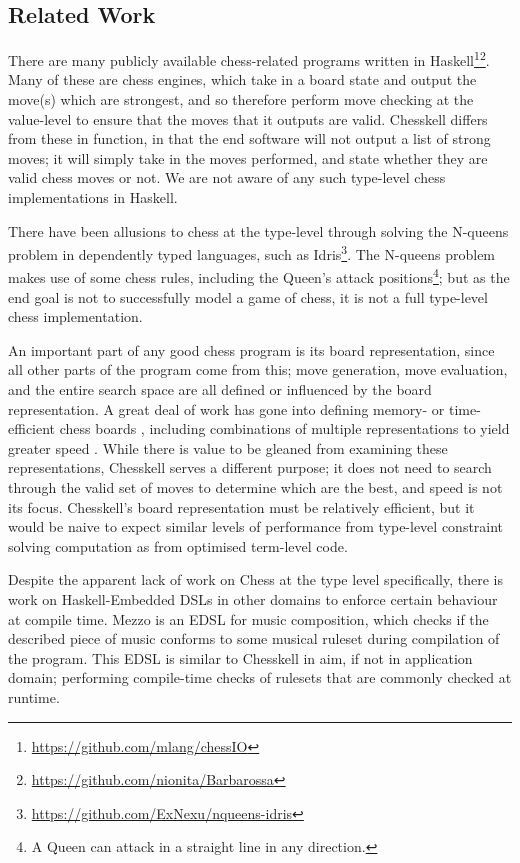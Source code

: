 \documentclass[12pt, a4paper, bibliography=totocnumbered]{scrartcl}
\begin{document}

\subsection{Related Work}

There are many publicly available chess-related programs written in Haskell\footnote{\url{https://github.com/mlang/chessIO}}\footnote{\url{https://github.com/nionita/Barbarossa}}. Many of these are chess engines, which take in a board state and output the move(s) which are strongest, and so therefore perform move checking at the value-level to ensure that the moves that it outputs are valid. Chesskell differs from these in function, in that the end software will not output a list of strong moves; it will simply take in the moves performed, and state whether they are valid chess moves or not. We are not aware of any such type-level chess implementations in Haskell.

There have been allusions to chess at the type-level through solving the N-queens problem in dependently typed languages, such as Idris\footnote{\url{https://github.com/ExNexu/nqueens-idris}}. The N-queens problem makes use of some chess rules, including the Queen's attack positions\footnote{A Queen can attack in a straight line in any direction.}; but as the end goal is not to successfully model a game of chess, it is not a full type-level chess implementation.

An important part of any good chess program is its board representation, since all other parts of the program come from this; move generation, move evaluation, and the entire search space are all defined or influenced by the board representation. A great deal of work has gone into defining memory- or time-efficient chess boards \cite{bitboard} \cite{searchtables}, including combinations of multiple representations to yield greater speed \cite{bitandccr}. While there is value to be gleaned from examining these representations, Chesskell serves a different purpose; it does not need to search through the valid set of moves to determine which are the best, and speed is not its focus. Chesskell's board representation must be relatively efficient, but it would be naive to expect similar levels of performance from type-level constraint solving computation as from optimised term-level code.

Despite the apparent lack of work on Chess at the type level specifically, there is work on Haskell-Embedded DSLs in other domains to enforce certain behaviour at compile time. Mezzo \cite{mezzohaskellsymposium} is an EDSL for music composition, which checks if the described piece of music conforms to some musical ruleset during compilation of the program. This EDSL is similar to Chesskell in aim, if not in application domain; performing compile-time checks of rulesets that are commonly checked at runtime.
\end{document}
